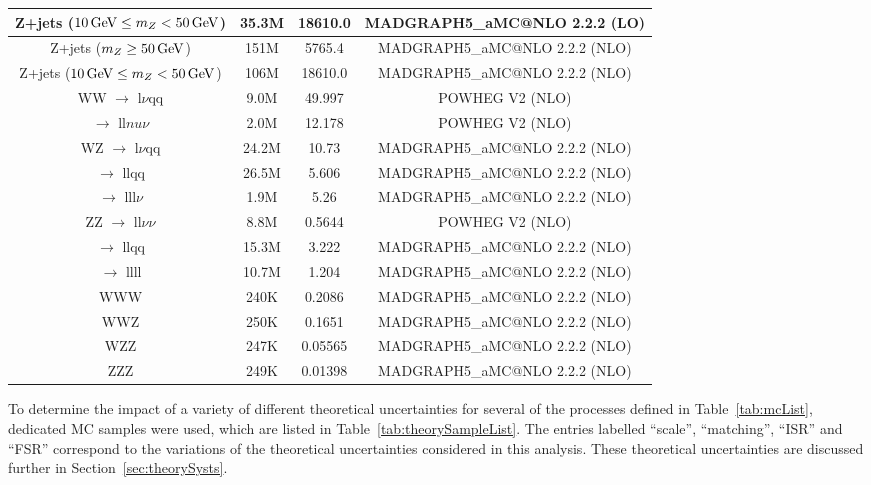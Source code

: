 \begin{table}[htbp]
{\begin{tabular}{cccc}
   Z+jets ($10 \,\text{Ge\hspace{-.08em}V} \leq m_{Z} < 50\,\text{Ge\hspace{-.08em}V}$) & 35.3M & 18610.0 & MADGRAPH5\_aMC@NLO 2.2.2 (LO) \\
   \hline
   Z+jets ($m_{Z} \geq 50\,\text{Ge\hspace{-.08em}V} $) & 151M & 5765.4 & MADGRAPH5\_aMC@NLO 2.2.2 (NLO) \\
   Z+jets ($10 \,\text{Ge\hspace{-.08em}V} \leq m_{Z} < 50\,\text{Ge\hspace{-.08em}V}$) & 106M & 18610.0 & MADGRAPH5\_aMC@NLO 2.2.2 (NLO) \\
   \hline
   WW $\rightarrow$ l$\nu$qq & 9.0M & 49.997  & POWHEG V2 (NLO) \\
      $\rightarrow$ ll$nu\nu$ & 2.0M & 12.178 & POWHEG V2 (NLO) \\
   \hline
   WZ $\rightarrow$ l$\nu$qq & 24.2M & 10.73 & MADGRAPH5\_aMC@NLO 2.2.2 (NLO) \\
      $\rightarrow$ llqq & 26.5M & 5.606 & MADGRAPH5\_aMC@NLO 2.2.2 (NLO) \\
      $\rightarrow$ lll$\nu$ & 1.9M & 5.26 & MADGRAPH5\_aMC@NLO 2.2.2 (NLO) \\
   \hline
   ZZ $\rightarrow$ ll$\nu\nu$ & 8.8M & 0.5644 & POWHEG V2 (NLO) \\
      $\rightarrow$ llqq & 15.3M & 3.222 & MADGRAPH5\_aMC@NLO 2.2.2 (NLO) \\
      $\rightarrow$ llll & 10.7M & 1.204 & MADGRAPH5\_aMC@NLO 2.2.2 (NLO) \\
   \hline
   WWW & 240K & 0.2086 & MADGRAPH5\_aMC@NLO 2.2.2 (NLO) \\
   \hline
   WWZ & 250K & 0.1651 & MADGRAPH5\_aMC@NLO 2.2.2 (NLO) \\
   \hline
   WZZ & 247K & 0.05565 & MADGRAPH5\_aMC@NLO 2.2.2 (NLO) \\
   \hline
   ZZZ & 249K & 0.01398 & MADGRAPH5\_aMC@NLO 2.2.2 (NLO) \\
   \hline
   
 \end{tabular}}
\end{table}

To determine the impact of a variety of different theoretical uncertainties for several of the processes defined in Table~\ref{tab:mcList}, dedicated MC samples were used, which are listed in Table~\ref{tab:theorySampleList}.
The entries labelled ``scale'', ``matching'', ``ISR'' and ``FSR'' correspond to the variations of the theoretical uncertainties considered in this analysis.
These theoretical uncertainties are discussed further in Section~\ref{sec:theorySysts}.

